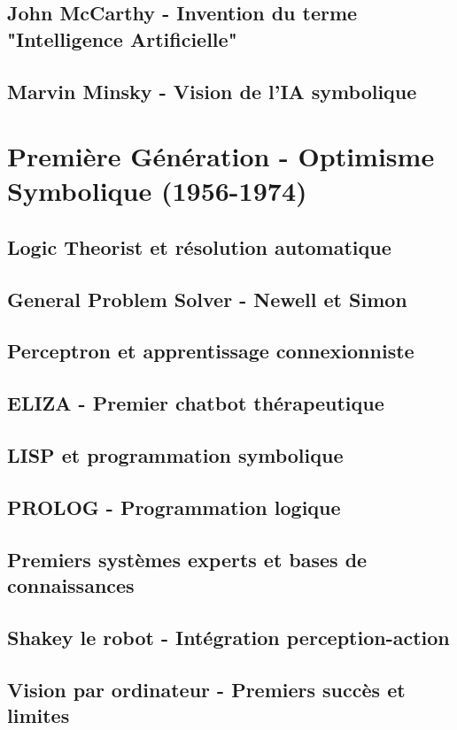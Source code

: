 \documentclass[12pt,a4paper]{book}
\begin{document}
\section{John McCarthy - Invention du terme "Intelligence Artificielle"}
\section{Marvin Minsky - Vision de l'IA symbolique}

\chapter{Première Génération - Optimisme Symbolique (1956-1974)}
\section{Logic Theorist et résolution automatique}
\section{General Problem Solver - Newell et Simon}
\section{Perceptron et apprentissage connexionniste}
\section{ELIZA - Premier chatbot thérapeutique}
\section{LISP et programmation symbolique}
\section{PROLOG - Programmation logique}
\section{Premiers systèmes experts et bases de connaissances}
\section{Shakey le robot - Intégration perception-action}
\section{Vision par ordinateur - Premiers succès et limites}
\end{document}

